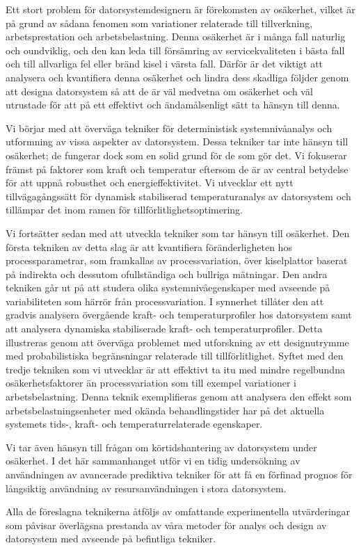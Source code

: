 Ett stort problem för datorsystemdesignern är förekomsten av osäkerhet, vilket
är på grund av sådana fenomen som variationer relaterade till tillverkning,
arbetsprestation och arbetsbelastning. Denna osäkerhet är i många fall naturlig
och oundviklig, och den kan leda till försämring av servicekvaliteten i bästa
fall och till allvarliga fel eller bränd kisel i värsta fall. Därför är det
viktigt att analysera och kvantifiera denna osäkerhet och lindra dess skadliga
följder genom att designa datorsystem så att de är väl medvetna om osäkerhet och
väl utrustade för att på ett effektivt och ändamålsenligt sätt ta hänsyn till
denna.

Vi börjar med att överväga tekniker för deterministisk systemnivåanalys och
utformning av vissa aspekter av datorsystem. Dessa tekniker tar inte hänsyn till
osäkerhet; de fungerar dock som en solid grund för de som gör det. Vi fokuserar
främst på faktorer som kraft och temperatur eftersom de är av central betydelse
för att uppnå robusthet och energieffektivitet. Vi utvecklar ett nytt
tillvägagångssätt för dynamisk stabiliserad temperaturanalys av datorsystem och
tillämpar det inom ramen för tillförlitlighetsoptimering.

Vi fortsätter sedan med att utveckla tekniker som tar hänsyn till osäkerhet. Den
första tekniken av detta slag är att kvantifiera föränderligheten hos
processparametrar, som framkallas av processvariation, över kiselplattor baserat
på indirekta och dessutom ofullständiga och bullriga mätningar. Den andra
tekniken går ut på att studera olika systemnivåegenskaper med avseende på
variabiliteten som härrör från processvariation. I synnerhet tillåter den att
gradvis analysera övergående kraft- och temperaturprofiler hos datorsystem samt
att analysera dynamiska stabiliserade kraft- och temperaturprofiler. Detta
illustreras genom att överväga problemet med utforskning av ett designutrymme
med probabilistiska begränsningar relaterade till tillförlitlighet. Syftet med
den tredje tekniken som vi utvecklar är att effektivt ta itu med mindre
regelbundna osäkerhetsfaktorer än processvariation som till exempel variationer
i arbetsbelastning. Denna teknik exemplifieras genom att analysera den effekt
som arbetsbelastningsenheter med okända behandlingstider har på det aktuella
systemets tids-, kraft- och temperaturrelaterade egenskaper.

Vi tar även hänsyn till frågan om körtidshantering av datorsystem under
osäkerhet. I det här sammanhanget utför vi en tidig undersökning av användningen
av avancerade prediktiva tekniker för att få en förfinad prognos för långsiktig
användning av resursanvändningen i stora datorsystem.

Alla de föreslagna teknikerna åtföljs av omfattande experimentella utvärderingar
som påvisar överlägsna prestanda av våra metoder för analys och design av
datorsystem med avseende på befintliga tekniker.

